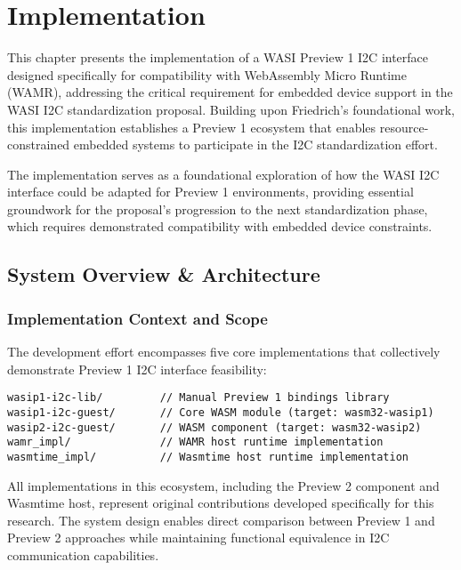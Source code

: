 \chapter{Implementation}
\label{chap:implementation}

This chapter presents the implementation of a WASI Preview 1 I2C interface designed specifically for compatibility with WebAssembly Micro Runtime (WAMR), addressing the critical requirement for embedded device support in the WASI I2C standardization proposal. Building upon Friedrich's foundational work, this implementation establishes a Preview 1 ecosystem that enables resource-constrained embedded systems to participate in the I2C standardization effort.

The implementation serves as a foundational exploration of how the WASI I2C interface could be adapted for Preview 1 environments, providing essential groundwork for the proposal's progression to the next standardization phase, which requires demonstrated compatibility with embedded device constraints.

\section{System Overview \& Architecture}
\label{sec:system-overview}

\subsection{Implementation Context and Scope}

The development effort encompasses five core implementations that collectively demonstrate Preview 1 I2C interface feasibility:

\begin{verbatim}
wasip1-i2c-lib/         // Manual Preview 1 bindings library
wasip1-i2c-guest/       // Core WASM module (target: wasm32-wasip1)
wasip2-i2c-guest/       // WASM component (target: wasm32-wasip2)
wamr_impl/              // WAMR host runtime implementation
wasmtime_impl/          // Wasmtime host runtime implementation
\end{verbatim}

All implementations in this ecosystem, including the Preview 2 component and Wasmtime host, represent original contributions developed specifically for this research. The system design enables direct comparison between Preview 1 and Preview 2 approaches while maintaining functional equivalence in I2C communication capabilities.

